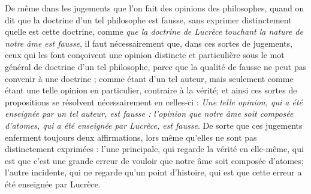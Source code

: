 De même dans les jugements que l'on fait des opinions des philosophes, quand on dit que la doctrine d'un tel philosophe est fausse, sans exprimer distinctement quelle est cette doctrine, comme \emph{que la doctrine de Lucrèce touchant la nature de notre âme est fausse}, il faut nécessairement que, dans ces sortes de jugements, ceux qui les font conçoivent une opinion distincte et particulière sous le mot général de doctrine d'un tel philosophe, parce que la qualité de fausse ne peut pas convenir à une doctrine ; comme étant d'un tel auteur, mais seulement comme étant une telle opinion en particulier, contraire à la vérité; et ainsi ces sortes de propositions se résolvent nécessairement en celles-ci : \emph{Une telle opinion, qui a été enseignée par un tel auteur, est fausse : l'opinion que notre âme soit composée d'atomes, qui a été enseignée par Lucrèce, est fausse}. De sorte que ces jugements enferment toujours deux affirmations, lors même qu'elles ne sont pas distinctement exprimées : l'une principale, qui regarde la vérité en elle-même, qui est que c'est une grande erreur de vouloir que notre âme soit composée d'atomes; l'autre incidente, qui ne regarde qu'un point d'histoire, qui est que cette erreur a été enseignée par Lucrèce.
